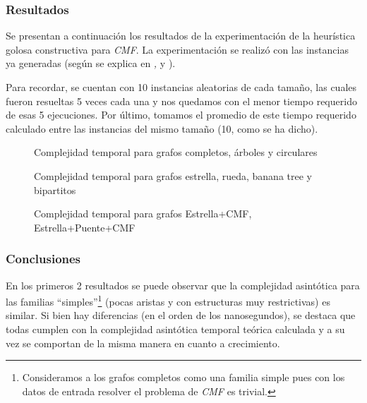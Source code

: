 \subsubsection{Resultados}
\par Se presentan a continuaci\'on los resultados de la experimentaci\'on
    de la heur\'istica golosa constructiva para \emph{CMF}. La experimentaci\'on se realiz\'o
    con las instancias ya generadas (seg\'un se explica en \emph{,
    } y \emph{}).

\par Para recordar, se cuentan con 10 instancias aleatorias de cada tama\~no,
    las cuales fueron resueltas 5 veces cada una y nos quedamos con el menor tiempo
    requerido de esas 5 ejecuciones. Por \'ultimo, tomamos el promedio de este tiempo
    requerido calculado entre las instancias del mismo tama\~no (10, como se ha
    dicho).

\bigskip

\begin{figure}[H]
    \centering
    \fontsize{8}{10}\selectfont
    \resizebox{0.8\textwidth}{!}{}
    \caption{Complejidad temporal para grafos completos, \'arboles y circulares}
\end{figure}

\begin{figure}[H]
    \centering
    \fontsize{8}{10}\selectfont
    \resizebox{0.8\textwidth}{!}{}
    \caption{Complejidad temporal para grafos estrella, rueda, banana tree y bipartitos}
\end{figure}

\begin{figure}[H]
    \centering
    \fontsize{8}{10}\selectfont
    \resizebox{0.8\textwidth}{!}{}
    \caption{Complejidad temporal para grafos Estrella+CMF, Estrella+Puente+CMF}
\end{figure}

\subsubsection{Conclusiones}
\par En los primeros 2 resultados se puede observar que la complejidad asint\'otica
    para las familias ``simples''\footnote{Consideramos a los grafos completos
    como una familia simple pues con los datos de entrada resolver el problema
    de \emph{CMF} es trivial.} (pocas aristas y con estructuras muy restrictivas)
    es similar. Si bien hay diferencias (en el orden de los nanosegundos), se
    destaca que todas cumplen con la complejidad asint\'otica temporal te\'orica
    calculada y a su vez se comportan de la misma manera en cuanto a crecimiento.

